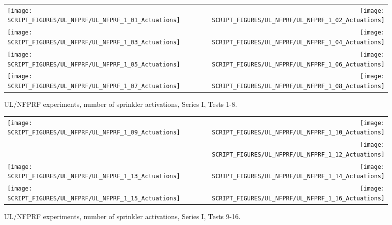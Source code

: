 \begin{figure}[p]
\begin{tabular*}{\textwidth}{l@{\extracolsep{\fill}}r}
\texttt{[image: SCRIPT\_FIGURES/UL\_NFPRF/UL\_NFPRF\_1\_01\_Actuations]} &
\texttt{[image: SCRIPT\_FIGURES/UL\_NFPRF/UL\_NFPRF\_1\_02\_Actuations]} \\
\texttt{[image: SCRIPT\_FIGURES/UL\_NFPRF/UL\_NFPRF\_1\_03\_Actuations]} &
\texttt{[image: SCRIPT\_FIGURES/UL\_NFPRF/UL\_NFPRF\_1\_04\_Actuations]} \\
\texttt{[image: SCRIPT\_FIGURES/UL\_NFPRF/UL\_NFPRF\_1\_05\_Actuations]} &
\texttt{[image: SCRIPT\_FIGURES/UL\_NFPRF/UL\_NFPRF\_1\_06\_Actuations]} \\
\texttt{[image: SCRIPT\_FIGURES/UL\_NFPRF/UL\_NFPRF\_1\_07\_Actuations]} &
\texttt{[image: SCRIPT\_FIGURES/UL\_NFPRF/UL\_NFPRF\_1\_08\_Actuations]} \\
\end{tabular*}
\caption{UL/NFPRF experiments, number of sprinkler activations, Series I, Tests 1-8.}
\label{UL_NFPRF_1}
\end{figure}

\begin{figure}[p]
\begin{tabular*}{\textwidth}{l@{\extracolsep{\fill}}r}
\texttt{[image: SCRIPT\_FIGURES/UL\_NFPRF/UL\_NFPRF\_1\_09\_Actuations]} &
\texttt{[image: SCRIPT\_FIGURES/UL\_NFPRF/UL\_NFPRF\_1\_10\_Actuations]} \\
&
\texttt{[image: SCRIPT\_FIGURES/UL\_NFPRF/UL\_NFPRF\_1\_12\_Actuations]} \\
\texttt{[image: SCRIPT\_FIGURES/UL\_NFPRF/UL\_NFPRF\_1\_13\_Actuations]} &
\texttt{[image: SCRIPT\_FIGURES/UL\_NFPRF/UL\_NFPRF\_1\_14\_Actuations]} \\
\texttt{[image: SCRIPT\_FIGURES/UL\_NFPRF/UL\_NFPRF\_1\_15\_Actuations]} &
\texttt{[image: SCRIPT\_FIGURES/UL\_NFPRF/UL\_NFPRF\_1\_16\_Actuations]} \\
\end{tabular*}
\caption{UL/NFPRF experiments, number of sprinkler activations, Series I, Tests 9-16.}
\label{UL_NFPRF_2}
\end{figure}


